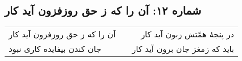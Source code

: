 \begin{center}
\section*{شماره ۱۲: آن را که ز حق روزفزون آید کار}
\label{sec:012}
\begin{longtable}{l p{0.5cm} r}
آن را که ز حق روزفزون آید کار
&&
در پنجهٔ همّتش زبون آید کار
\\
جان کندن بیفایده کاری نبود
&&
باید که زمغز جان برون آید کار
\\
\end{longtable}
\end{center}
